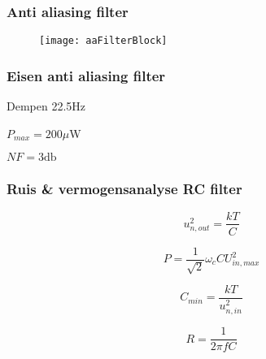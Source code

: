 
\begin{frame}
    \frametitle{Anti aliasing filter}

    \begin{figure}
        \centering
        \texttt{[image: aaFilterBlock]}
    \end{figure}

\end{frame}


\begin{frame}
    \frametitle{Eisen anti aliasing filter}
    
    \centering
    \vspace{1cm}

    Dempen 22.5Hz


    $P_{max}=200\mu$W


    $NF=3\si{\decibel}$
    \vspace{2cm}


    \pause

    \begin{figure}
        \centering
        \def\svgwidth{0.4\textwidth}
        
    \end{figure}

\end{frame}
\begin{frame}
    \frametitle{Ruis \& vermogensanalyse RC filter}

    \pause

    \begin{equation*}\label{eq:dividerNoise}
        u_{n,out}^2 = \frac{kT}{C}
    \end{equation*}

    \begin{equation*} \label{eq:filterPower}
        P = \frac{1}{\sqrt{2}}\omega_cCU_{in,max}^2
    \end{equation*}

    \pause

    \begin{equation*} \label{eq:filterCapMin}
        C_{min} = \frac{kT}{u_{n,in}^2}
    \end{equation*}

    \begin{equation*}
        R = \frac{1}{2\pi fC}
    \end{equation*}

    \pause[1]

    \begin{figure}
        \centering
        \def\svgwidth{0.4\textwidth}
        
    \end{figure}

\end{frame}
